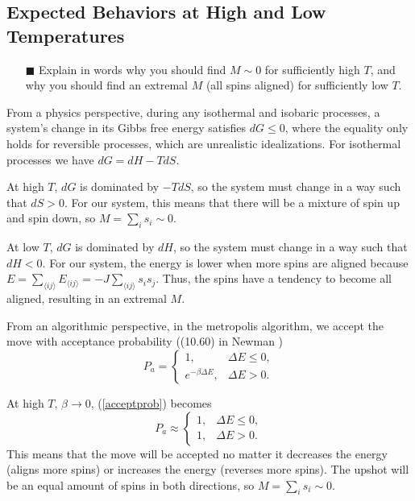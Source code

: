 \documentclass[11pt]{article}
\begin{document}
\subsection{Expected Behaviors at High and Low Temperatures}
\begin{itemize}
    \item[$\blacksquare$] Explain in words why you should find $M \sim 0$ for sufficiently high $T$, and why you should find an extremal $M$ (all spins aligned) for sufficiently low $T$.
\end{itemize}
From a physics perspective, during any isothermal and isobaric processes, a system's change in its Gibbs free energy satisfies $dG \leq 0$, where the equality only holds for reversible processes, which are unrealistic idealizations. For isothermal processes we have $dG = dH - TdS$.

At high $T$, $dG$ is dominated by $-TdS$, so the system must change in a way such that $dS > 0$. For our system, this means that there will be a mixture of spin up and spin down, so $M = \sum_i s_i \sim 0$.

At low $T$, $dG$ is dominated by $dH$, so the system must change in a way such that $dH < 0$. For our system, the energy is lower when more spins are aligned because $E = \sum_{\langle ij \rangle} E_{\langle ij \rangle} = -J \sum_{\langle ij \rangle} s_i s_j$. Thus, the spins have a tendency to become all aligned, resulting in an extremal $M$.

From an algorithmic perspective, in the metropolis algorithm, we accept the move with acceptance probability ((10.60) in Newman \cite{newman2013computational})
\begin{equation}\label{acceptprob}
    P_a = \begin{cases}
        1, & \Delta E \leq 0, \\
        e^{-\beta \Delta E}, & \Delta E > 0.
    \end{cases}
\end{equation}

At high $T$, $\beta \rightarrow 0$, (\ref{acceptprob}) becomes
\begin{equation}
    P_a \approx \begin{cases}
        1, & \Delta E \leq 0, \\
        1, & \Delta E > 0.
    \end{cases}
\end{equation}
This means that the move will be accepted no matter it decreases the energy (aligns more spins) or increases the energy (reverses more spins). The upshot will be an equal amount of spins in both directions, so $M = \sum_i s_i \sim 0$.
\end{document}
